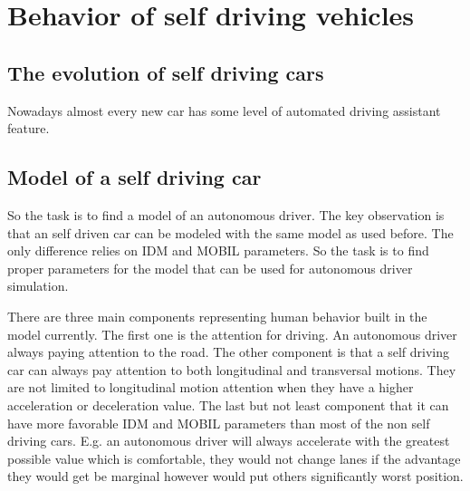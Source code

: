 \chapter{Behavior of self driving vehicles}
	\section{The evolution of self driving cars}
		Nowadays almost every new car has some level of automated driving assistant feature.
	\section{Model of a self driving car}
		So the task is to find a model of an autonomous driver. The key observation is that an self driven car can be modeled with the same model as used before. The only difference relies on IDM and MOBIL parameters. So the task is to find proper parameters for the model that can be used for autonomous driver simulation.

		There are three main components representing human behavior built in the model currently. The first one is the attention for driving. An autonomous driver always paying attention to the road. The other component is that a self driving car can always pay attention to both longitudinal and transversal motions. They are not limited to longitudinal motion attention when they have a higher acceleration or deceleration value. The last but not least component that it can have more favorable IDM and MOBIL parameters than most of the non self driving cars. E.g. an autonomous driver will always accelerate with the greatest possible value which is comfortable, they would not change lanes if the advantage they would get be marginal however would put others significantly worst position.